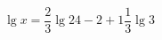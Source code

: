 \begin{ex}[type=equation]
	\begin{condition}
		$\lg x = \dfrac{2}{3}\lg 24 - 2 + 1\dfrac{1}{3}\lg 3$
	\end{condition}
\end{ex}